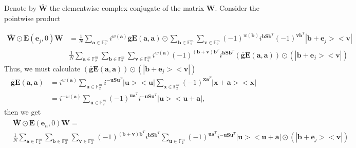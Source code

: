\documentclass{article}
\begin{document}
	Denote by $\overline{\mathbf{W}}$ the elementwise complex conjugate of the matrix $\mathbf{W}$. Consider the pointwise product
	
	\begin{align*}
		\overline{\mathbf{W}} \odot \mathbf{E}(\mathbf{e}_j, 0)\mathbf{W}& = \frac{1}{N} \sum_{\mathbf{a} \in \mathbb{F}^m_2} i^{w(\mathbf{a})}\overline{\mathbf{g}}\mathbf{E}(\mathbf{a},\mathbf{a})\odot \sum_{\mathbf{b} \in \mathbb{F}_2^m}{\sum_{\mathbf{v} \in \mathbb{F}_2^m}{ (-1)^{w(\mathbf{b})} i^{\mathbf{b}\mathbf{S}\mathbf{b}^T}(-1)^{\mathbf{v}\mathbf{b}^T} |\mathbf{b}+\mathbf{e}_j><\mathbf{v}|}}\\
		&\frac{1}{N} \sum_{\mathbf{a} \in \mathbb{F}^m_2}{\sum_{\mathbf{b} \in \mathbb{F}_2^m}{\sum_{\mathbf{v} \in \mathbb{F}_2^m}}i^{w(\mathbf{a})}(-1)^{(\mathbf{b+v})\mathbf{b}^T}  i^{\mathbf{b}\mathbf{S}\mathbf{b}^T} (\overline{\mathbf{g}}\mathbf{E}(\mathbf{a},\mathbf{a}))\odot (|\mathbf{b}+\mathbf{e}_j><\mathbf{v}|) }
	\end{align*}
Thus, we must calculate $(\overline{\mathbf{g}}\mathbf{E}(\mathbf{a},\mathbf{a}))\odot (|\mathbf{b}+\mathbf{e}_j><\mathbf{v}|)$
\begin{align*}
	\overline{\mathbf{g}}\mathbf{E}(\mathbf{a},\mathbf{a}) &=i^{w(\mathbf{a})} \sum_{\mathbf{u} \in \mathbb{F}_2^m}{i^{-\mathbf{u S}\mathbf{u}^T} |\mathbf{u}><\mathbf{u}|}\sum_{\mathbf{x} \in \mathbb{F}_2^m}{ (-1)^{\mathbf{x}\mathbf{a}^T}|\mathbf{x+a}><\mathbf{x}|} \\
	&=i^{-w(\mathbf{a})} \sum_{\mathbf{u} \in \mathbb{F}_2^m}{(-1)^{\mathbf{u}\mathbf{a}^T}i^{-\mathbf{u S}\mathbf{u}^T} |\mathbf{u}><\mathbf{u+a}|},
\end{align*} 
then we get
\begin{align*}
	&\overline{\mathbf{W}} \odot \mathbf{E}(\mathbf{e}_n, 0)\mathbf{W} = \\
	& \frac{1}{N} \sum_{\mathbf{a} \in \mathbb{F}^m_2}{\sum_{\mathbf{b} \in \mathbb{F}_2^m}{\sum_{\mathbf{v} \in \mathbb{F}_2^m}}(-1)^{(\mathbf{b+v})\mathbf{b}^T}  i^{\mathbf{b}\mathbf{S}\mathbf{b}^T} \sum_{\mathbf{u} \in \mathbb{F}_2^m}{(-1)^{\mathbf{u}\mathbf{a}^T}i^{-\mathbf{u S}\mathbf{u}^T} |\mathbf{u}><\mathbf{u+a}|} \odot (|\mathbf{b}+\mathbf{e}_j><\mathbf{v}|) }
\end{align*}
\end{document}
